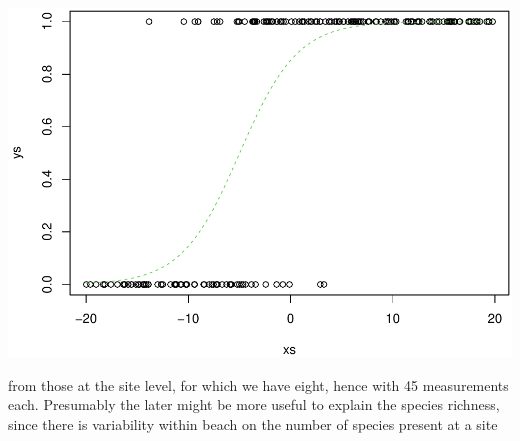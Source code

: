 \documentclass[
]{book}
\newenvironment{Shaded}{\begin{snugshade}}{\end{snugshade}}
\newcommand{\AttributeTok}[1]{\textcolor[rgb]{0.13,0.29,0.53}{#1}}
\newcommand{\DecValTok}[1]{\textcolor[rgb]{0.00,0.00,0.81}{#1}}
\newcommand{\FloatTok}[1]{\textcolor[rgb]{0.00,0.00,0.81}{#1}}
\newcommand{\FunctionTok}[1]{\textcolor[rgb]{0.13,0.29,0.53}{\textbf{#1}}}
\newcommand{\NormalTok}[1]{#1}
\newcommand{\SpecialCharTok}[1]{\textcolor[rgb]{0.81,0.36,0.00}{\textbf{#1}}}
\newcommand{\StringTok}[1]{\textcolor[rgb]{0.31,0.60,0.02}{#1}}
\begin{document}
\includegraphics{ECOMODbook_files/figure-latex/unnamed-chunk-14-1.pdf}

from those at the site level, for which we have eight, hence with 45 measurements each. Presumably the later might be more useful to explain the species richness, since there is variability within beach on the number of species present at a site

\begin{Shaded}
\end{Shaded}
\end{document}
